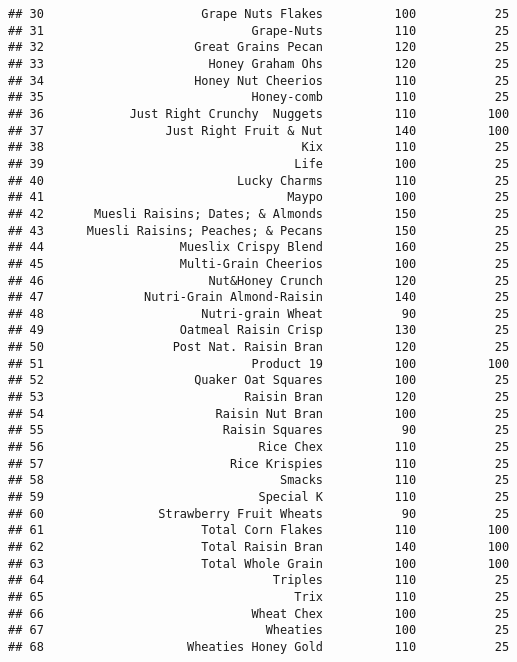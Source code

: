 \documentclass[
]{article}
\begin{document}
\begin{verbatim}
## 30                      Grape Nuts Flakes          100           25
## 31                             Grape-Nuts          110           25
## 32                     Great Grains Pecan          120           25
## 33                       Honey Graham Ohs          120           25
## 34                     Honey Nut Cheerios          110           25
## 35                             Honey-comb          110           25
## 36            Just Right Crunchy  Nuggets          110          100
## 37                 Just Right Fruit & Nut          140          100
## 38                                    Kix          110           25
## 39                                   Life          100           25
## 40                           Lucky Charms          110           25
## 41                                  Maypo          100           25
## 42       Muesli Raisins; Dates; & Almonds          150           25
## 43      Muesli Raisins; Peaches; & Pecans          150           25
## 44                   Mueslix Crispy Blend          160           25
## 45                   Multi-Grain Cheerios          100           25
## 46                       Nut&Honey Crunch          120           25
## 47              Nutri-Grain Almond-Raisin          140           25
## 48                      Nutri-grain Wheat           90           25
## 49                   Oatmeal Raisin Crisp          130           25
## 50                  Post Nat. Raisin Bran          120           25
## 51                             Product 19          100          100
## 52                     Quaker Oat Squares          100           25
## 53                            Raisin Bran          120           25
## 54                        Raisin Nut Bran          100           25
## 55                         Raisin Squares           90           25
## 56                              Rice Chex          110           25
## 57                          Rice Krispies          110           25
## 58                                 Smacks          110           25
## 59                              Special K          110           25
## 60                Strawberry Fruit Wheats           90           25
## 61                      Total Corn Flakes          110          100
## 62                      Total Raisin Bran          140          100
## 63                      Total Whole Grain          100          100
## 64                                Triples          110           25
## 65                                   Trix          110           25
## 66                             Wheat Chex          100           25
## 67                               Wheaties          100           25
## 68                    Wheaties Honey Gold          110           25
\end{verbatim}
\end{document}
